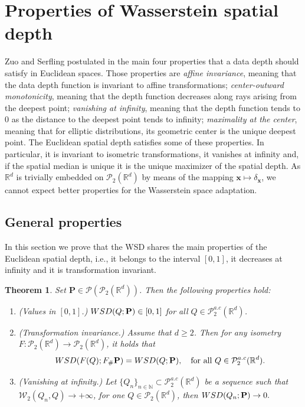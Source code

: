 \documentclass{imsart}
\newtheorem {Theorem}[Proposition]{Theorem}
\numberwithin{equation}{section}
\def\N{\mathbb{N}}
\def\R{\mathbb{R}}
\def\x{\mathbf{x}}
\def\N{\mathbb N}
\def\x{\mathbf x}
\begin{document}
\section{Properties of Wasserstein spatial depth}
\label{section:properties}

Zuo and Serfling 
postulated in \cite{zuo2000general} 
the main four properties that a data depth  should satisfy in Euclidean spaces. Those properties are  {\it affine invariance}, meaning that the data depth function is invariant to affine transformations; {\it center-outward monotonicity}, meaning that the depth function decreases along rays arising from the deepest point;  {\it vanishing at infinity}, meaning that the depth function tends to $0$ as the distance to the deepest point tends to infinity; {\it maximality at the center}, meaning that for elliptic distributions, its geometric center is the unique deepest point. The Euclidean spatial depth satisfies some of these properties. In particular, it is invariant to isometric  transformations, it vanishes at infinity and, if the spatial median is unique it is the unique maximizer of the spatial  depth.    As $\R^d$ is trivially embedded on 
$\mathcal{P}_2(\R^d)$ by means of the mapping $\x\mapsto \delta_\x$, we cannot expect better properties for the Wasserstein space adaptation. 

\subsection{General properties}
In this section we prove that the WSD  shares the main properties of the Euclidean spatial depth, i.e., it belongs to the interval $[0,1]$, it decreases at infinity and it is transformation invariant.
\begin{Theorem}\label{Theo:Main}
	Set  $\mathbf{P}\in \mathcal{P}(\mathcal{P}_2(\R^d)) $. Then the following properties hold: 
	\begin{enumerate}
		\item \big(Values in $[0,1]$.\big) \label{th:pointIn01} $ {\rm WSD}(Q; {\bf P})\in [0,1]$ for all $Q\in  \mathcal{P}^{a.c}_2(\R^d)$.
		\item \big(Transformation invariance.\big) \label{TransformInv}  Assume that $d\geq 2$. Then for any  isometry $F:\mathcal{P}_2(\R^d)\to \mathcal{P}_2(\R^d)$, it holds that 
		$$   {\rm WSD}( F(Q); F_{\#} {\bf P})= {\rm WSD}(Q;  {\bf P}), \quad \text{for all $Q\in  \mathcal{P}^{a.c}_2(\R^d)$.} $$
		\item \big(Vanishing at infinity.\big) Let $\{Q_n\}_{n\in \N}\subset   \mathcal{P}^{a.c}_2(\R^d)$ be a sequence such that $\mathcal{W}_2(Q_n,Q)\to +\infty$, for one $Q\in \mathcal{P}_2(\R^d)$, then 
		$  {\rm WSD}(Q_n; {\bf P}) \to 0 . $
	\end{enumerate}
\end{Theorem}
\end{document}
